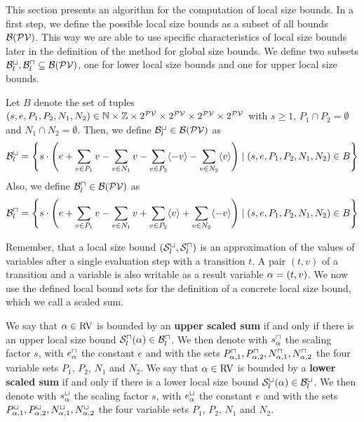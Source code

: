 This section presents an algorithm for the computation of local size bounds.
In a first step, we define the possible local size bounds as a subset of all bounds $\mathcal{B}(\mathcal{PV})$.
This way we are able to use specific characteristics of local size bounds later in the definition of the method for global size bounds.
We define two subsets $\mathcal{B}^\sqcup_l, \mathcal{B}^\sqcap_l \subseteq \mathcal{B}(\mathcal{PV})$, one for lower local size bounds and one for upper local size bounds.

\begin{definition}
  Let $B$ denote the set of tuples $(s,e,P_1,P_2,N_1,N_2) \in \mathbb{N} \times \mathbb{Z} \times 2^{\mathcal{PV}} \times 2^{\mathcal{PV}} \times 2^{\mathcal{PV}} \times 2^{\mathcal{PV}}$ with $s \geq 1$, $P_1 \cap P_2 = \emptyset$ and $N_1 \cap N_2 = \emptyset$.
  Then, we define $\mathcal{B}^\sqcup_l \in \mathcal{B}(\mathcal{PV})$ as 
  \[ \mathcal{B}^\sqcup_l = \left\{
    s \cdot \left(
        e
      + \sum_{v \in P_1} v
      - \sum_{v \in N_1} v
      - \sum_{v \in P_2} \langle-v\rangle
      - \sum_{v \in N_2} \langle v\rangle
      \right) \mid (s,e,P_1,P_2,N_1,N_2) \in B \right\} \]
  Also, we define $\mathcal{B}^\sqcap_l \in \mathcal{B}(\mathcal{PV})$ as 
  \[ \mathcal{B}^\sqcap_l = \left\{
    s \cdot \left(
        e
      + \sum_{v \in P_1} v
      - \sum_{v \in N_1} v
      + \sum_{v \in P_2} \langle v\rangle
      + \sum_{v \in N_2} \langle-v\rangle
      \right) \mid (s,e,P_1,P_2,N_1,N_2) \in B \right\} \]
\end{definition}

Remember, that a local size bound ${({\mathcal{S}^\sqcup_l}, {\mathcal{S}^\sqcap_l})}$ is an approximation of the values of variables after a single evaluation step with a transition $t$.
A pair $(t,v)$ of a transition and a variable is also writable as a result variable $\alpha = (t,v)$.
We now use the defined local bound sets for the definition of a concrete local size bound, which we call a scaled sum.

\begin{definition}
  We say that $\alpha \in \text{RV}$ is bounded by an \textbf{upper scaled sum} if and only if there is an upper local size bound ${\mathcal{S}^\sqcap_l}(\alpha) \in \mathcal{B}^\sqcap_l$.
  We then denote with $s^\sqcap_\alpha$ the scaling factor $s$, with $e^\sqcap_\alpha$ the constant $e$ and with the sets $P_{\alpha,1}^\sqcap, P_{\alpha,2}^\sqcap, N_{\alpha,1}^\sqcap, N_{\alpha,2}^\sqcap$ the four variable sets $P_1$, $P_2$, $N_1$ and $N_2$.
  We say that $\alpha \in \text{RV}$ is bounded by a \textbf{lower scaled sum} if and only if there is a lower local size bound ${\mathcal{S}^\sqcup_l}(\alpha) \in \mathcal{B}^\sqcup_l$.
  We then denote with $s^\sqcup_\alpha$ the scaling factor $s$, with $e^\sqcup_\alpha$ the constant $e$ and with the sets $P_{\alpha,1}^\sqcup, P_{\alpha,2}^\sqcup, N_{\alpha,1}^\sqcup, N_{\alpha,2}^\sqcup$ the four variable sets $P_1$, $P_2$, $N_1$ and $N_2$.
\end{definition}

